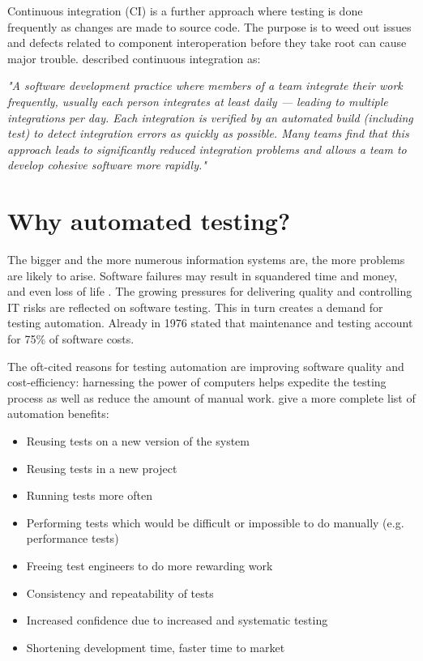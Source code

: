 \documentclass[12pt,a4paper,oneside,pdftex]{report}
\begin{document}
Continuous integration (CI) is a further approach where testing is done frequently as changes are made to source code. The purpose is to weed out issues and defects related to component interoperation before they take root can cause major trouble. \citet{duvall2007continuous} described continuous integration as:

\begin{adjustwidth}{2.5em}{0pt}
\small
\emph{"A software development practice where members of a team integrate their work frequently, usually each person integrates at least daily --- leading to multiple integrations per day. Each integration is verified by an automated build (including test) to detect integration errors as quickly as possible. Many teams find that this approach leads to significantly reduced integration problems and allows a team to develop cohesive software more rapidly."}
\normal
\end{adjustwidth}


\section{Why automated testing?}


The bigger and the more numerous information systems are, the more problems are likely to arise. Software failures may result in squandered time and money, and even loss of life \citep{leveson1993investigation, defense1992software}. The growing pressures for delivering quality and controlling IT risks are reflected on software testing. This in turn creates a demand for testing automation. Already in 1976 \citet{myers1976software} stated that maintenance and testing account for 75\% of software costs.

The oft-cited reasons for testing automation are improving software quality and cost-efficiency: harnessing the power of computers helps expedite the testing process as well as reduce the amount of manual work. \citet{fewster1999software} give a more complete list of automation benefits:

\begin{itemize}
\item Reusing tests on a new version of the system
\item Reusing tests in a new project
\item Running tests more often
\item Performing tests which would be difficult or impossible to do manually (e.g. performance tests)
\item Freeing test engineers to do more rewarding work
\item Consistency and repeatability of tests
\item Increased confidence due to increased and systematic testing
\item Shortening development time, faster time to market
\end{itemize}
\end{document}
